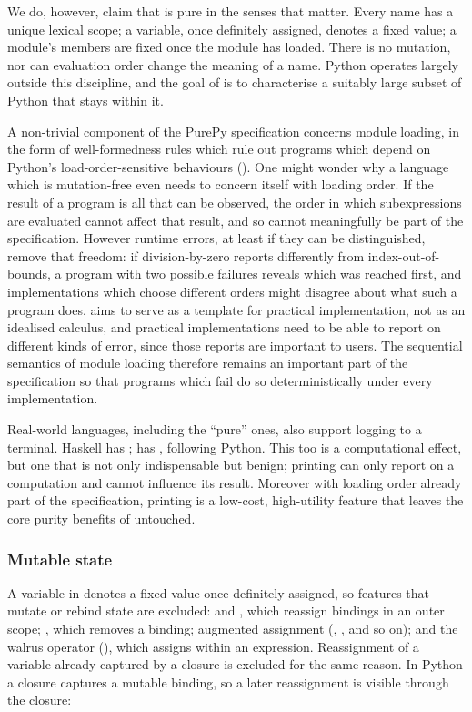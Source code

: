 We do, however, claim that \PurePy is pure in the senses that matter. Every name has a unique lexical scope; a
variable, once definitely assigned, denotes a fixed value; a module's members are fixed once the module has
loaded. There is no mutation, nor can evaluation order change the meaning of a name. Python operates largely
outside this discipline, and the goal of \PurePy is to characterise a suitably large subset of Python that
stays within it.

A non-trivial component of the PurePy specification concerns module loading, in the form of well-formedness
rules which rule out programs which depend on Python's load-order-sensitive behaviours
(). One might wonder why a language which is mutation-free even needs to concern
itself with loading order. If the result of a program is all that can be observed, the order in which
subexpressions are evaluated cannot affect that result, and so cannot meaningfully be part of the
specification. However runtime errors, at least if they can be distinguished, remove that freedom: if
division-by-zero reports differently from index-out-of-bounds, a program with two possible failures reveals
which was reached first, and implementations which choose different orders might disagree about what such a
program does. \PurePy aims to serve as a template for practical implementation, not as an idealised calculus,
and practical implementations need to be able to report on different kinds of error, since those reports are
important to users. The sequential semantics of module loading therefore remains an important part of the
specification so that programs which fail do so deterministically under every implementation.

Real-world languages, including the ``pure'' ones, also support logging to a terminal. Haskell has
; \PurePy has , following Python. This too is a computational effect, but one
that is not only indispensable but benign; printing can only report on a computation and cannot influence its
result. Moreover with loading order already part of the specification, printing is a low-cost, high-utility
feature that leaves the core purity benefits of \PurePy untouched.

\subsubsection{Mutable state}
\label{sec:no-mutable-state}

A variable in \PurePy denotes a fixed value once definitely assigned, so features that mutate or rebind state
are excluded:  and , which reassign bindings in an outer scope;
, which removes a binding; augmented assignment (\pyinline{+=}, \pyinline{-=}, and so on); and
the walrus operator (\pyinline{:=}), which assigns within an expression. Reassignment of a variable already
captured by a closure is excluded for the same reason. In Python a closure captures a mutable binding, so a
later reassignment is visible through the closure:

